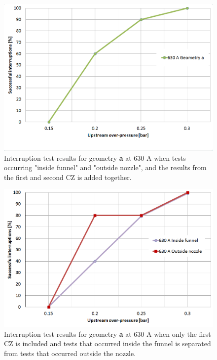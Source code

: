 \documentclass[10pt,b5paper,twoside]{article}
\begin{document}
\begin{figure}[H]
\centering
\includegraphics[scale=0.45]{Bilder/Results/geoA630amp_riktig.PNG}
\caption{Interruption test results for geometry \textbf{a} at 630 A when tests occurring "inside funnel" and "outside nozzle", and the results from the first and second CZ is added together.} \label{fig:results630AgeoA}
\end{figure}

\begin{figure}[H]
\centering
\includegraphics[scale=0.45]{Bilder/Results/geoA630ampcomp.PNG}
\caption{Interruption test results for geometry \textbf{a} at 630 A when only the first CZ is included and tests that occurred inside the funnel is separated from tests that occurred outside the nozzle.} \label{fig:results630AgeoAcomp}
\end{figure}
\end{document}
